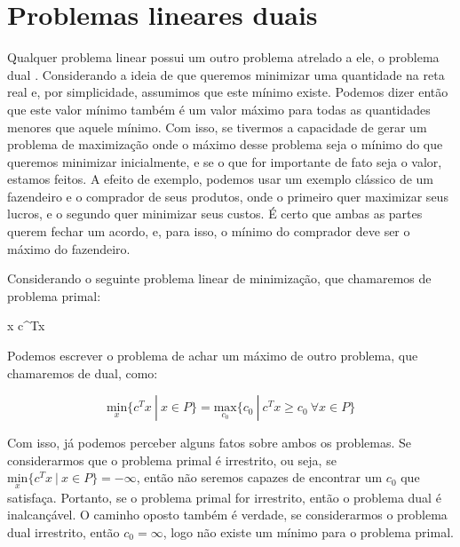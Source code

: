 \section{Problemas lineares duais}
\label{sec_prob_dual}
Qualquer problema linear possui um outro problema atrelado a ele, o problema dual \cite{fischetti2019}.
Considerando a ideia de que queremos minimizar uma quantidade na reta real e, por
simplicidade, assumimos que este mínimo existe. Podemos dizer então que este valor
mínimo também é um valor máximo para todas as quantidades menores que aquele mínimo. Com
isso, se tivermos a capacidade de gerar um problema de maximização onde o máximo desse
problema seja o mínimo do que queremos minimizar inicialmente, e se o que for importante de
fato seja o valor, estamos feitos. A efeito de exemplo, podemos usar um exemplo clássico de
um fazendeiro e o comprador de seus produtos, onde o primeiro quer maximizar seus lucros, e
o segundo quer minimizar seus custos. É certo que ambas as partes querem fechar um acordo, e,
para isso, o mínimo do comprador deve ser o máximo do fazendeiro.

Considerando o seguinte problema linear de minimização, que chamaremos de problema primal:

\vspace{-15pt}
\begin{mini!}
{x}{ c^Tx \label{duall_obj}}{\label{prob_duall}}{}
\end{mini!}

Podemos escrever o problema de achar um máximo de outro problema, que chamaremos de dual, como:

\begin{equation}
\underset{x}{\mathrm{min}}\{c^Tx\ |\ x \in P \} = \underset{c_0}{\mathrm{max}}\{c_0\ |\ c^Tx \geq c_0\ \forall x \in P\}
\end{equation}

Com isso, já podemos perceber alguns fatos sobre ambos os problemas. Se considerarmos que o
problema primal é irrestrito, ou seja, se \(\underset{x}{\mathrm{min}}\{c^Tx\ |\ x \in P\} = - \infty \),
então não seremos capazes de encontrar um \(c_0\) que satisfaça. Portanto, se o problema primal
for irrestrito, então o problema dual é inalcançável. O caminho oposto também é verdade, se
considerarmos o problema dual irrestrito, então \(c_0 = \infty\), logo não existe um mínimo para o problema
primal.

